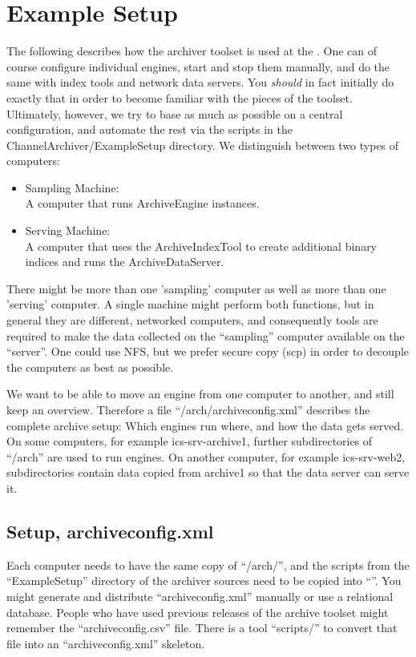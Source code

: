 \chapter{Example Setup} \label{ch:examplesetup}
The following describes how the archiver toolset is used at the
. One can of course configure
individual engines, start and stop them manually, and do the same with
index tools and network data servers. You \emph{should} in fact
initially do exactly that in order to become familiar with the pieces
of the toolset.
Ultimately, however, we try to base as much as possible on a central
configuration, and automate the rest via the scripts in the
ChannelArchiver/ExampleSetup directory.
We distinguish between two types of computers:
\begin{itemize}
\item Sampling Machine:\\
      A computer that runs ArchiveEngine instances.
\item Serving Machine:\\
      A computer that uses the ArchiveIndexTool to create
      additional binary indices and runs the ArchiveDataServer.
\end{itemize}

\noindent There might be more than one 'sampling' computer as well as more
than one 'serving' computer.  A single machine might perform both
functions, but in general they are different, networked computers, and
consequently tools are required to make the data collected on the
``sampling'' computer available on the ``server''.  One could use NFS,
but we prefer secure copy (scp) in order to decouple the computers as
best as possible.

We want to be able to move an engine from one computer to another, and
still keep an overview.  Therefore a file ``/arch/archiveconfig.xml''
describes the complete archive setup: Which engines run where, and how
the data gets served.  On some computers, for example
ics-srv-archive1, further subdirectories of ``/arch'' are used to run
engines.  On another computer, for example ics-srv-web2,
subdirectories contain data copied from archive1 so that the data
server can serve it.

\section{Setup, archiveconfig.xml}
Each computer needs to have the same copy of
``/arch/'',
and the scripts from the ``ExampleSetup'' directory of the archiver
sources need to be copied into ``''.
You might generate and distribute ``archiveconfig.xml'' manually or use a
relational database.  People who have used previous releases of the
archive toolset might remember the ``archiveconfig.csv'' file. There is a
tool ``scripts/'' to convert that
file into an ``archiveconfig.xml'' skeleton.

